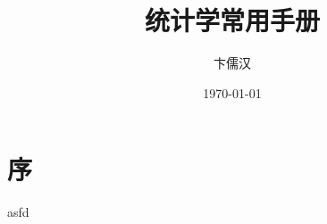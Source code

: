 \documentclass[a4,cn,single]{elegantbook}
\title{统计学常用手册}
\author{卞儒汉}
\date{\today}
\begin{document}
\tableofcontents


\chapter*{序}


asfd
\end{document}

